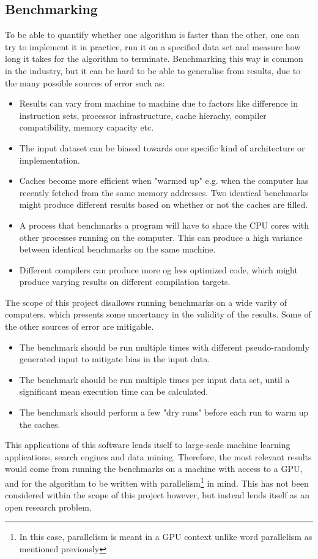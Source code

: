 \subsection{Benchmarking}
To be able to quantify whether one algorithm is faster than the other, one can try to implement it in practice, run it on a specified data set and measure how long it takes for the algorithm to terminate. Benchmarking this way is common in the industry, but it can be hard to be able to generalise from results, due to the many possible sources of error such as:
\begin{itemize}
    \item Results can vary from machine to machine due to factors like difference in instruction sets, processor infrastructure, cache hierachy, compiler compatibility, memory capacity etc.
    \item The input dataset can be biased towards one specific kind of architecture or implementation.
    \item Caches become more efficient when "warmed up" e.g. when the computer has recently fetched from the same memory addresses. Two identical benchmarks might produce different results based on whether or not the caches are filled.
    \item A process that benchmarks a program will have to share the CPU cores with other processes running on the computer. This can produce a high variance between identical benchmarks on the same machine.
    \item Different compilers can produce more og less optimized code, which might produce varying results on different compilation targets.
\end{itemize}
The scope of this project disallows running benchmarks on a wide varity of computers, which presents some uncertancy in the validity of the results. Some of the other sources of error are mitigable.
\begin{itemize}
    \item The benchmark should be run multiple times with different pseudo-randomly generated input to mitigate bias in the input data.
    \item The benchmark should be run multiple times per input data set, until a significant mean execution time can be calculated.
    \item The benchmark should perform a few "dry runs" before each run to warm up the caches.
\end{itemize}
This applications of this software lends itself to large-scale machine learning applications, search engines and data mining. Therefore, the most relevant results would come from running the benchmarks on a machine with access to a GPU, and for the algorithm to be written with parallelism\footnote{In this case, parallelism is meant in a GPU context unlike word parallelism as mentioned previously} in mind. This has not been considered within the scope of this project however, but instead lends itself as an open research problem.
